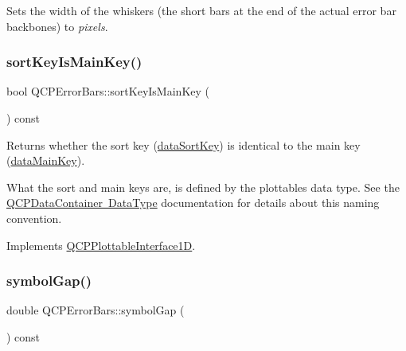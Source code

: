Sets the width of the whiskers (the short bars at the end of the actual error bar backbones) to {\itshape pixels}. \mbox{\label{class_q_c_p_error_bars_af75958b95d9b9c7edfd9851c1d123850}} 
\subsubsection{\texorpdfstring{sortKeyIsMainKey()}{sortKeyIsMainKey()}}
{\footnotesize\ttfamily bool Q\+C\+P\+Error\+Bars\+::sort\+Key\+Is\+Main\+Key (\begin{DoxyParamCaption}{ }\end{DoxyParamCaption}) const\hspace{0.3cm}{\ttfamily [virtual]}}

Returns whether the sort key (\mbox{\hyperlink{class_q_c_p_error_bars_a3000a036124880a90c629d124c1cd1e2}{data\+Sort\+Key}}) is identical to the main key (\mbox{\hyperlink{class_q_c_p_error_bars_a7cba420078adc523efa59fb8c6ca23e0}{data\+Main\+Key}}).

What the sort and main keys are, is defined by the plottable\textquotesingle{}s data type. See the \mbox{\hyperlink{class_q_c_p_data_container_qcpdatacontainer-datatype}{Q\+C\+P\+Data\+Container Data\+Type}} documentation for details about this naming convention. 

Implements \mbox{\hyperlink{class_q_c_p_plottable_interface1_d_a229e65e7ab968dd6cd0e259fa504b79d}{Q\+C\+P\+Plottable\+Interface1D}}.

\mbox{\label{class_q_c_p_error_bars_a2c969749fa0db565a42b80db9da5f388}} 
\subsubsection{\texorpdfstring{symbolGap()}{symbolGap()}}
{\footnotesize\ttfamily double Q\+C\+P\+Error\+Bars\+::symbol\+Gap (\begin{DoxyParamCaption}{ }\end{DoxyParamCaption}) const\hspace{0.3cm}{\ttfamily [inline]}}

\mbox{\label{class_q_c_p_error_bars_ae5a292470366ec92b248753f83b8646e}} 
